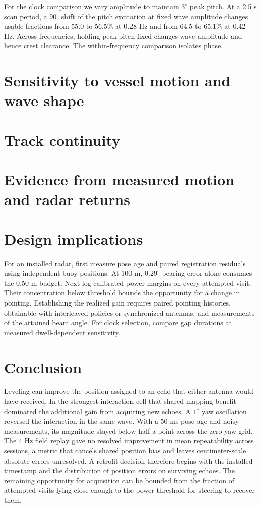 \documentclass[nofoot]{asmeconf}
\begin{document}
For the clock comparison we vary amplitude to maintain $3^\circ$ peak pitch. At a 2.5 s scan period, a $90^\circ$ shift of the pitch excitation at fixed wave amplitude changes usable fractions from 55.0 to 56.5\% at 0.28 Hz and from 64.5 to 65.1\% at 0.42 Hz. Across frequencies, holding peak pitch fixed changes wave amplitude and hence crest clearance. The within-frequency comparison isolates phase.




\section{Sensitivity to vessel motion and wave shape}



\section{Track continuity}




\section{Evidence from measured motion and radar returns}




\section{Design implications}
For an installed radar, first measure pose age and paired registration residuals using independent buoy positions. At 100 m, $0.29^\circ$ bearing error alone consumes the 0.50 m budget. Next log calibrated power margins on every attempted visit. Their concentration below threshold bounds the opportunity for a change in pointing. Establishing the realized gain requires paired pointing histories, obtainable with interleaved policies or synchronized antennas, and measurements of the attained beam angle. For clock selection, compare gap durations at measured dwell-dependent sensitivity.

\section{Conclusion}
Leveling can improve the position assigned to an echo that either antenna would have received. In the strongest interaction cell that shared mapping benefit dominated the additional gain from acquiring new echoes. A $1^\circ$ yaw oscillation reversed the interaction in the same wave. With a 50 ms pose age and noisy measurements, its magnitude stayed below half a point across the zero-yaw grid. The 4 Hz field replay gave no resolved improvement in mean repeatability across sessions, a metric that cancels shared position bias and leaves centimeter-scale absolute errors unresolved. A retrofit decision therefore begins with the installed timestamp and the distribution of position errors on surviving echoes. The remaining opportunity for acquisition can be bounded from the fraction of attempted visits lying close enough to the power threshold for steering to recover them.
\end{document}
